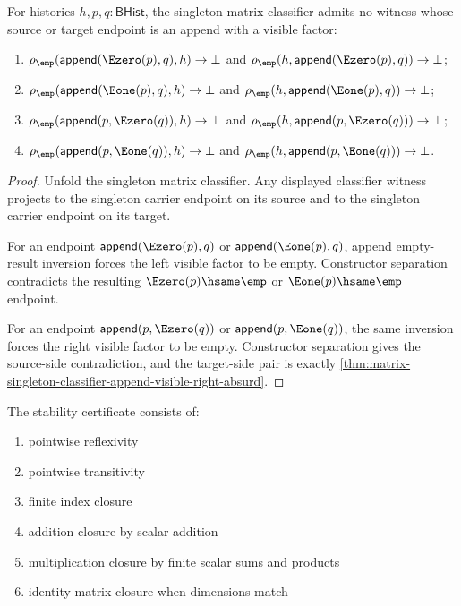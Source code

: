 \begin{lemma}
\label{lem:matrix-singleton-classifier-append-visible-factor-exclusion}
For histories $h,p,q:\mathsf{BHist}$, the singleton matrix classifier admits
no witness whose source or target endpoint is an append with a visible factor:
\begin{enumerate}
  \item $\rho_{\emp}(\mathsf{append}(\Ezero(p),q),h)\to\bot$ and
        $\rho_{\emp}(h,\mathsf{append}(\Ezero(p),q))\to\bot$;
  \item $\rho_{\emp}(\mathsf{append}(\Eone(p),q),h)\to\bot$ and
        $\rho_{\emp}(h,\mathsf{append}(\Eone(p),q))\to\bot$;
  \item $\rho_{\emp}(\mathsf{append}(p,\Ezero(q)),h)\to\bot$ and
        $\rho_{\emp}(h,\mathsf{append}(p,\Ezero(q)))\to\bot$;
  \item $\rho_{\emp}(\mathsf{append}(p,\Eone(q)),h)\to\bot$ and
        $\rho_{\emp}(h,\mathsf{append}(p,\Eone(q)))\to\bot$.
\end{enumerate}
\end{lemma}
\begin{proof}
Unfold the singleton matrix classifier. Any displayed classifier witness
projects to the singleton carrier endpoint on its source and to the singleton
carrier endpoint on its target.

For an endpoint $\mathsf{append}(\Ezero(p),q)$ or
$\mathsf{append}(\Eone(p),q)$, append empty-result inversion forces the left
visible factor to be empty. Constructor separation contradicts the resulting
$\Ezero(p)\hsame\emp$ or $\Eone(p)\hsame\emp$ endpoint.

For an endpoint $\mathsf{append}(p,\Ezero(q))$ or
$\mathsf{append}(p,\Eone(q))$, the same inversion forces the right visible
factor to be empty. Constructor separation gives the source-side contradiction,
and the target-side pair is exactly
\autoref{thm:matrix-singleton-classifier-append-visible-right-absurd}.
\end{proof}

\begin{definition}
\label{def:matrix-stability-certificate}
The stability certificate consists of:
\begin{enumerate}
  \item pointwise reflexivity
  \item pointwise transitivity
  \item finite index closure
  \item addition closure by scalar addition
  \item multiplication closure by finite scalar sums and products
  \item identity matrix closure when dimensions match
\end{enumerate}
\end{definition}

